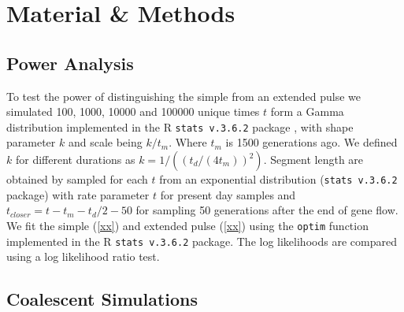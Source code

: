\documentclass[11pt]{article}
\begin{document}
\section{Material \& Methods}\label{methods}

\subsection{Power Analysis}\label{power analysis}

To test the power of distinguishing the simple from an extended pulse we simulated 100, 1000, 10000 and 100000 unique times $t$ form a Gamma distribution implemented in the R \texttt{stats v.3.6.2} package \citep{R_Core_Team_2019}, with shape parameter $k$ and scale being $k/t_m$. Where $t_m$ is 1500 generations ago. We defined $k$ for different durations as $k=1/((t_d/(4t_m))^2)$. Segment length are obtained by sampled for each $t$ from an exponential distribution (\texttt{stats v.3.6.2} package) with rate parameter $t$ for present day samples and $t_{closer}= t - t_m - t_d/2 -50$ for sampling 50 generations after the end of gene flow.
We fit the simple (\ref{xx}) and extended pulse (\ref{xx}) using the \texttt{optim} function implemented in the R \texttt{stats v.3.6.2} package. The log likelihoods are compared using a log likelihood ratio test.

\subsection{Coalescent Simulations}\label{coalescent simulations}
\end{document}
